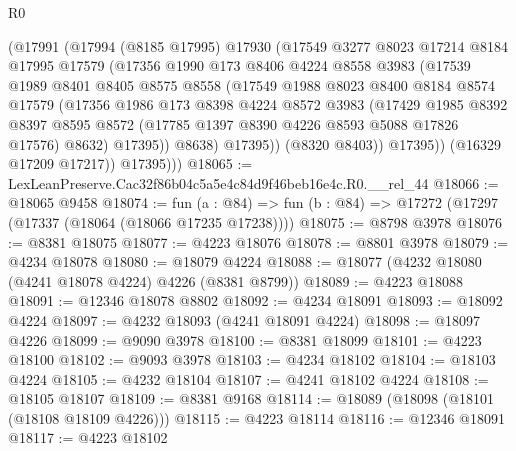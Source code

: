 \begin{lexlean}{R0}
\begin{coremodule}
              (@17991
                (@17994
                  (@8185 @17995)
                  @17930
                  (@17549
                    @3277
                    @8023
                    @17214
                    @8184
                    @17995
                    @17579
                    (@17356
                      @1990
                      @173
                      @8406
                      @4224
                      @8558
                      @3983
                      (@17539
                        @1989
                        @8401
                        @8405
                        @8575
                        @8558
                        (@17549
                          @1988
                          @8023
                          @8400
                          @8184
                          @8574
                          @17579
                          (@17356
                            @1986
                            @173
                            @8398
                            @4224
                            @8572
                            @3983
                            (@17429
                              @1985
                              @8392
                              @8397
                              @8595
                              @8572
                              (@17785 @1397 @8390 @4226 @8593 @5088 @17826 @17576)
                              @8632)
                            @17395))
                        @8638)
                      @17395))
                  (@8320 @8403))
                @17395))
            (@16329 @17209 @17217))
          @17395)))
@18065 := LexLeanPreserve.Cac32f86b04c5a5e4c84d9f46beb16e4c.R0.__rel_44
@18066 := @18065 @9458
@18074 := fun (a : @84) => fun (b : @84) => @17272 (@17297 (@17337 (@18064 (@18066 @17235 @17238))))
@18075 := @8798 @3978
@18076 := @8381 @18075
@18077 := @4223 @18076
@18078 := @8801 @3978
@18079 := @4234 @18078
@18080 := @18079 @4224
@18088 := @18077 (@4232 @18080 (@4241 @18078 @4224) @4226 (@8381 @8799))
@18089 := @4223 @18088
@18091 := @12346 @18078 @8802
@18092 := @4234 @18091
@18093 := @18092 @4224
@18097 := @4232 @18093 (@4241 @18091 @4224)
@18098 := @18097 @4226
@18099 := @9090 @3978
@18100 := @8381 @18099
@18101 := @4223 @18100
@18102 := @9093 @3978
@18103 := @4234 @18102
@18104 := @18103 @4224
@18105 := @4232 @18104
@18107 := @4241 @18102 @4224
@18108 := @18105 @18107
@18109 := @8381 @9168
@18114 := @18089 (@18098 (@18101 (@18108 @18109 @4226)))
@18115 := @4223 @18114
@18116 := @12346 @18091
@18117 := @4223 @18102

\end{coremodule}
\end{lexlean}

